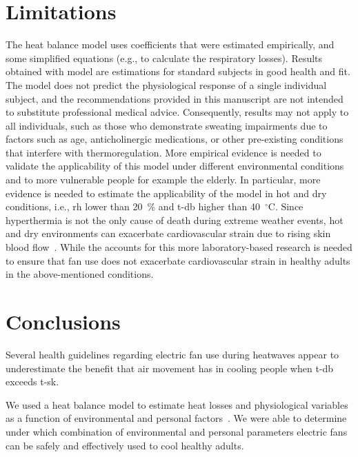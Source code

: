 \section*{Limitations}
The  heat balance model uses coefficients that were estimated empirically, and some simplified equations (e.g., to calculate the respiratory losses).
Results obtained with  model are estimations for standard subjects in good health and fit.
The model does not predict the physiological response of a single individual subject, and the recommendations provided in this manuscript are not intended to substitute professional medical advice.
Consequently, results may not apply to all individuals, such as those who demonstrate sweating impairments due to factors such as age, anticholinergic medications, or other pre-existing conditions that interfere with thermoregulation.
More empirical evidence is needed to validate the applicability of this model under different environmental conditions and to more vulnerable people for example the elderly.
In particular, more evidence is needed to estimate the applicability of the  model in hot and dry conditions, i.e., \ac{rh} lower than 20~\% and \ac{t-db} higher than 40~$^{\circ}$C.\@
Since hyperthermia is not the only cause of death during extreme weather events, hot and dry environments can exacerbate cardiovascular strain due to rising skin blood flow~\cite{Morris2021a}.
While the  accounts for this more laboratory-based research is needed to ensure that fan use does not exacerbate cardiovascular strain in healthy adults in the above-mentioned conditions.

\section{Conclusions}\label{sec:conclusions}
Several health guidelines regarding electric fan use during heatwaves appear to underestimate the benefit that air movement has in cooling people when \acf{t-db} exceeds \acf{t-sk}.

We used a heat balance model to estimate heat losses and physiological variables as a function of environmental and personal factors~\cite{Gagge1986}.
We were able to determine under which combination of environmental and personal parameters electric fans can be safely and effectively used to cool healthy adults.

